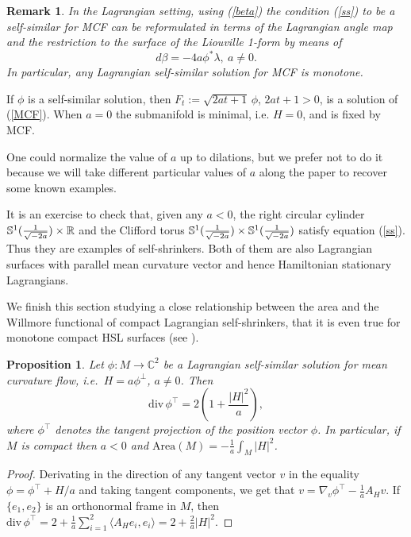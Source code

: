 \documentclass[leqno,11pt]{amsart}
\newtheorem{remark}{Remark}
\newtheorem{proposition}{Proposition}
\begin{document}
\begin{remark}
{\rm  In the Lagrangian setting, using (\ref{beta}) the condition
(\ref{ss}) to be a self-similar for MCF can be reformulated in
terms of the Lagrangian angle map and the restriction to the
surface of the Liouville 1-form by means of $$ d\beta=-4a \phi^*
\lambda, \ a\neq 0. $$ In particular, any Lagrangian self-similar
solution for MCF is monotone.}
\end{remark}

If $\phi $ is a self-similar solution, then
$F_t:=\sqrt{2at+1}\,\phi $, $2at+1>0$, is a solution of
(\ref{MCF}). When $a=0$ the submanifold is minimal, i.e. $H=0$,
and is fixed by MCF.

One could normalize the value of $a$ up to dilations, but we
prefer not to do it because we will take different particular
values of $a$ along the paper to recover some known examples.

It is an exercise to check that, given any $a<0$, the right
circular cylinder ${\mathbb{S}}^1({1 \over \sqrt{-2a}})\times {\mathbb{R}}$ and the
Clifford torus ${\mathbb{S}}^1({1\over \sqrt{-2a}})\times
{\mathbb{S}}^1({1\over\sqrt{-2a}})$ satisfy equation (\ref{ss}). Thus they
are examples of self-shrinkers. Both of them are also Lagrangian
surfaces with parallel mean curvature vector and hence Hamiltonian
stationary Lagrangians.

We finish this section studying a close relationship between the
area and the Willmore functional of compact Lagrangian
self-shrinkers, that it is even true for monotone compact HSL
surfaces (see \cite{Mi}).

\begin{proposition}\label{areaWillmore}
Let $\phi: M\rightarrow {\mathbb{C}}^2$ be a Lagrangian self-similar
solution for mean curvature flow, i.e.\ $H=a\phi^\perp$, $a\neq
0$. Then $$\mathrm{div}\,\phi^\top = 2\left( 1+\frac{|H|^2}{a}
\right),
$$ where $\phi^\top$ denotes the tangent projection of the position vector $\phi$. In
particular, if $M$ is compact then $a<0$ and
$\mathrm{Area}(M)=-\frac{1}{a}\int_M |H|^2$.
\end{proposition}
\begin{proof}
Derivating in the direction of any tangent vector $v$ in the
equality $\phi = \phi^\top + H/a$ and taking tangent components,
we get that $v=\nabla_v \phi^\top - \frac{1}{a}A_H v$. If $\{ e_1,
e_2 \}$ is an orthonormal frame in $M$, then
$\mathrm{div}\,\phi^\top = 2 +\frac{1}{a} \sum_{i=1}^2 \langle A_H
e_i, e_i \rangle =2 + \frac{2}{a}|H|^2.$
\end{proof}
\end{document}
